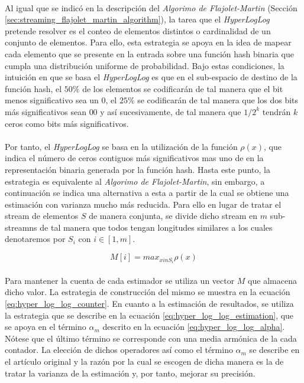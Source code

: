 \documentclass{subfiles}
\begin{document}
      \paragraph{}
      Al igual que se indicó en la descripción del \emph{Algorimo de Flajolet-Martin} (Sección \ref{sec:streaming_flajolet_martin_algorithm}), la tarea que el \emph{HyperLogLog} pretende resolver es el conteo de elementos distintos o cardinalidad de un conjunto de elementos. Para ello, esta estrategia se apoya en la idea de mapear cada elemento que se presente en la entrada sobre una función hash binaria que cumpla una distribución uniforme de probabilidad. Bajo estas condiciones, la intuición en que se basa el \emph{HyperLogLog} es que en el sub-espacio de destino de la función hash, el $50\%$ de los elementos se codificarán de tal manera que el bit menos significativo sea un $0$, el $25\%$ se codificarán de tal manera que los dos bits más significativos sean $00$ y así sucesivamente, de tal manera que $1/2^k$ tendrán $k$ ceros como bits más significativos.

      \paragraph{}
      Por tanto, el \emph{HyperLogLog} se basa en la utilización de la función $\rho(x)$, que indica el número de ceros contiguos más significativos mas uno de en la representación binaria generada por la función hash. Hasta este punto, la estrategia es equivalente al \emph{Algorimo de Flajolet-Martin}, sin embargo, a continuación se indica una alternativa a esta a partir de la cual se obtiene una estimación con varianza mucho más reducida. Para ello en lugar de tratar el stream de elementos $S$ de manera conjunta, se divide dicho stream en $m$ sub-streamns de tal manera que todos tengan longitudes similares a los cuales denotaremos por $S_i$ con $i \in [1,m]$.

      \begin{equation}
      \label{eq:hyper_log_log_counter}
        M[i] = max_{x in S_i}\rho(x)
      \end{equation}

      \paragraph{}
      Para mantener la cuenta de cada estimador se utiliza un vector $M$ que almacena dicho valor. La estrategia de construcción del mismo se muestra en la ecuación \eqref{eq:hyper_log_log_counter}. En cuanto a la estimación de resultados, se utiliza la estrategia que se describe en la ecuación \eqref{eq:hyper_log_log_estimation}, que se apoya en el término $\alpha_m$ descrito en la ecuación \eqref{eq:hyper_log_log_alpha}. Nótese que el último término se corresponde con una media armónica de la cada contador. La elección de dichos operadores así como el término $\alpha_m$ se describe en el artículo original \cite{flajolet2007hyperloglog} y la razón por la cual se escogen de dicha manera es la de tratar la varianza de la estimación y, por tanto, mejorar su precisión.
\end{document}
